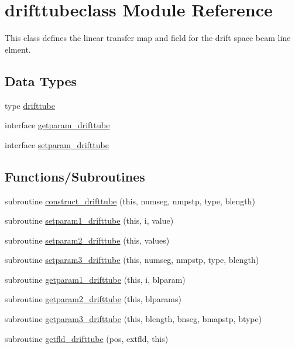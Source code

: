 \hypertarget{namespacedrifttubeclass}{}\section{drifttubeclass Module Reference}
\label{namespacedrifttubeclass}


This class defines the linear transfer map and field for the drift space beam line elment.  


\subsection*{Data Types}
\begin{DoxyCompactItemize}
\item 
type \mbox{\hyperlink{namespacedrifttubeclass_structdrifttubeclass_1_1drifttube}{drifttube}}
\item 
interface \mbox{\hyperlink{interfacedrifttubeclass_1_1getparam__drifttube}{getparam\+\_\+drifttube}}
\item 
interface \mbox{\hyperlink{interfacedrifttubeclass_1_1setparam__drifttube}{setparam\+\_\+drifttube}}
\end{DoxyCompactItemize}
\subsection*{Functions/\+Subroutines}
\begin{DoxyCompactItemize}
\item 
subroutine \mbox{\hyperlink{namespacedrifttubeclass_a322f55e58fbe6fb5e4ed93cd126e5ede}{construct\+\_\+drifttube}} (this, numseg, nmpstp, type, blength)
\item 
subroutine \mbox{\hyperlink{namespacedrifttubeclass_ae2e1974821a810c5d65afd4546b1a690}{setparam1\+\_\+drifttube}} (this, i, value)
\item 
subroutine \mbox{\hyperlink{namespacedrifttubeclass_a3883fd9688d0b98e279f57547de67b8c}{setparam2\+\_\+drifttube}} (this, values)
\item 
subroutine \mbox{\hyperlink{namespacedrifttubeclass_a5c05a55ca0f98570b2b02f3c84181015}{setparam3\+\_\+drifttube}} (this, numseg, nmpstp, type, blength)
\item 
subroutine \mbox{\hyperlink{namespacedrifttubeclass_ade5fb645fa735d4743cd431024727261}{getparam1\+\_\+drifttube}} (this, i, blparam)
\item 
subroutine \mbox{\hyperlink{namespacedrifttubeclass_af16030dcb46192b3748c28ceb1ca7d4f}{getparam2\+\_\+drifttube}} (this, blparams)
\item 
subroutine \mbox{\hyperlink{namespacedrifttubeclass_a4dc53dfc73175d3eb0d420c6cb9d64f8}{getparam3\+\_\+drifttube}} (this, blength, bnseg, bmapstp, btype)
\item 
subroutine \mbox{\hyperlink{namespacedrifttubeclass_aa903101ae6943402917a2f29a8aa67d3}{getfld\+\_\+drifttube}} (pos, extfld, this)
\end{DoxyCompactItemize}

